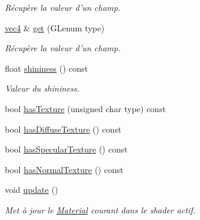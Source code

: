 \begin{DoxyCompactItemize}
\begin{DoxyCompactList}\small\item\em Récupère la valeur d'un champ. \end{DoxyCompactList}\item 
\hyperlink{structvec4}{vec4} \& \hyperlink{class_material_a6821fc2db0ee20168bba0e23658b93ff}{get} (G\+Lenum type)
\begin{DoxyCompactList}\small\item\em Récupère la valeur d'un champ. \end{DoxyCompactList}\item 
float \hyperlink{class_material_a9a938aa96f0d5a5dc4d17d43cfd4b42b}{shininess} () const 
\begin{DoxyCompactList}\small\item\em Valeur du shininess. \end{DoxyCompactList}\item 
bool \hyperlink{class_material_a5a489f2fa09381b917c6bc3244e02877}{has\+Texture} (unsigned char type) const 
\item 
bool \hyperlink{class_material_aa07bc322b6904dd4ccf61620a0eb703c}{has\+Diffuse\+Texture} () const 
\item 
bool \hyperlink{class_material_ab1d0beef91e6149c0ebfc6c82b977889}{has\+Specular\+Texture} () const 
\item 
bool \hyperlink{class_material_a9bfe6c055d9af6f3ef029b62cc57e6a1}{has\+Normal\+Texture} () const 
\item 
void \hyperlink{class_material_a3f43fe7bcfa721fd8156adb151adf45c}{update} ()
\begin{DoxyCompactList}\small\item\em Met à jour le \hyperlink{class_material}{Material} courant dans le shader actif. \end{DoxyCompactList}\end{DoxyCompactItemize}
